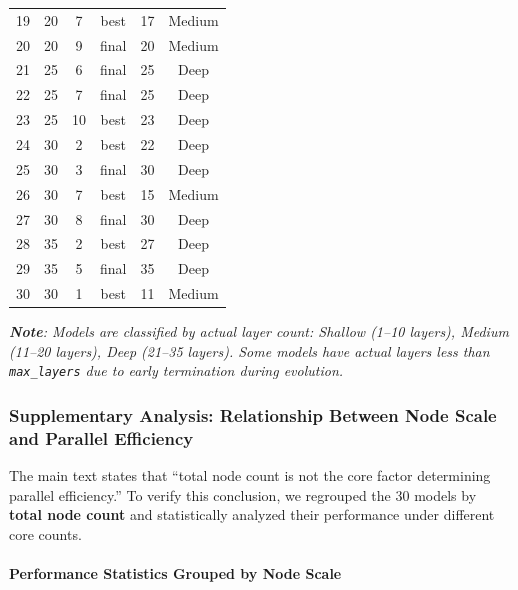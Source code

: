 \begin{table}[htbp]
{\begin{tabular}{cccccc}
        19 & 20 & 7 & best & 17 & Medium \\
        20 & 20 & 9 & final & 20 & Medium \\
        21 & 25 & 6 & final & 25 & Deep \\
        22 & 25 & 7 & final & 25 & Deep \\
        23 & 25 & 10 & best & 23 & Deep \\
        24 & 30 & 2 & best & 22 & Deep \\
        25 & 30 & 3 & final & 30 & Deep \\
        26 & 30 & 7 & best & 15 & Medium \\
        27 & 30 & 8 & final & 30 & Deep \\
        28 & 35 & 2 & best & 27 & Deep \\
        29 & 35 & 5 & final & 35 & Deep \\
        30 & 30 & 1 & best & 11 & Medium \\
        \bottomrule
    \end{tabular}%
    }
\end{table}

\textit{\textbf{Note}: Models are classified by actual layer count: Shallow (1--10 layers), Medium (11--20 layers), Deep (21--35 layers). Some models have actual layers less than \texttt{max\_layers} due to early termination during evolution.}

\subsubsection{Supplementary Analysis: Relationship Between Node Scale and Parallel Efficiency}

The main text states that ``total node count is not the core factor determining parallel efficiency.'' To verify this conclusion, we regrouped the 30 models by \textbf{total node count} and statistically analyzed their performance under different core counts.

\paragraph{Performance Statistics Grouped by Node Scale}

